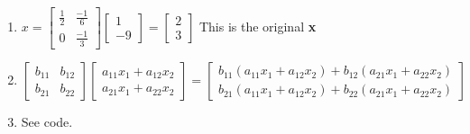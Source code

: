 \documentclass{article}
\begin{document}
\begin{enumerate}
	\item $x = 
	\begin{bmatrix}
		\frac{1}{2}	& \frac{-1}{6}\\
		0	&\frac{-1}{3}
	\end{bmatrix}
	\begin{bmatrix}
		1\\
		-9
	\end{bmatrix}
	= 
	\begin{bmatrix}
		2\\
		3
	\end{bmatrix}
	$
	This is the original \textbf{x}
	
	\item $
	\begin{bmatrix}
		b_{11}	& b_{12}\\
		b_{21}	& b_{22}
	\end{bmatrix}
	\begin{bmatrix}
		a_{11}x_1 + a_{12}x_2\\
		a_{21}x_1 + a_{22}x_2
	\end{bmatrix}
	=
	\begin{bmatrix}
		b_{11}(a_{11}x_1 + a_{12}x_2) + b_{12}(a_{21}x_1 + a_{22}x_2)\\
		b_{21}(a_{11}x_1 + a_{12}x_2) + b_{22}(a_{21}x_1 + a_{22}x_2)	
	\end{bmatrix}
	$
	\item See code. 
	

\end{enumerate}
\end{document}
